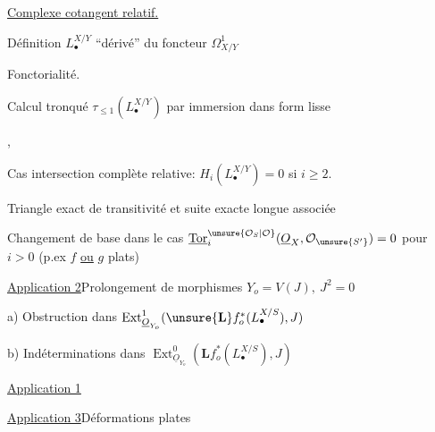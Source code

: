 \uline{Complexe cotangent relatif.}

Définition  $L_\bullet^{X/Y}$ ``dérivé'' du foncteur $\Omega^1_{X/Y}$

Fonctorialité.

Calcul tronqué $\tau_{\leq1}(L_\bullet^{X/Y})$ par immersion dans form lisse

, 

Cas intersection complète relative: $H_i(L_\bullet^{X/Y})=0$ si $i\geq2$.

Triangle exact de transitivité et suite exacte longue associée

Changement de base
dans le cas $\underline{\operatorname{Tor}}_i^{\unsure{\mathcal O_S|\mathcal O}}(\underline O_X,\mathcal O_{\unsure{S'}})=0$ pour $i>0$ (p.ex $f$ \uline{ou} $g$ plats)

\uline{Application 2}\quad Prolongement de morphismes
$Y_o=V(J),\ J^2=0$

a) Obstruction dans $\operatorname{Ext}^1_{\underline O_{Y_o}}(\unsure{\mathbf L}f_o^*(L_\bullet^{X/S}),J)$

b) Indéterminations dans $\operatorname{Ext}^0_{\underline O_{Y_o}}(\mathbf Lf_o^*(L_\bullet^{X/S}),J)$

\uline{Application 1}

\uline{Application 3}\quad Déformations plates

